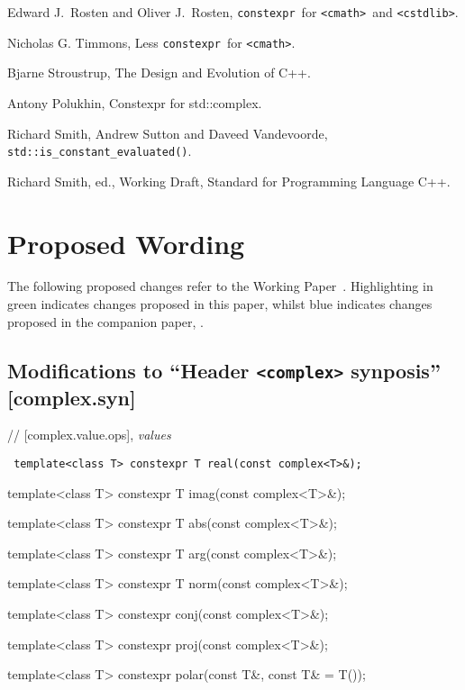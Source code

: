 \documentclass[prd,twocolumn,amsmath,amssymb,nofootinbib,eqsecnum]{revtex4-1}
\newcommand{\constexpr}{\code{constexpr}\xspace}
\newcommand{\code}[1]{{\tt #1}}
\newcommand{\header}[1]{{\tt <#1>}}
\newcommand{\cmath}{\header{cmath}}
\newcommand{\cstdlib}{\header{cstdlib}}
\newcommand{\highlight}[1]{{\color{green} #1}}
\newcommand{\oldhighlight}[1]{{\color{blue} #1}}
\begin{document}
\begin{thebibliography}{1}
	 Edward J.~Rosten and Oliver J.~Rosten, \constexpr\ for \cmath\ and \cstdlib.

	 Nicholas G. Timmons, Less \constexpr\ for \cmath.
	
	 Bjarne Stroustrup, The Design and Evolution of C++.

	 Antony Polukhin, Constexpr for std::complex.	
	
	 Richard Smith, Andrew Sutton and Daveed Vandevoorde, \code{std\!::\!is\_constant\_evaluated()}.
	
	 Richard Smith, ed., Working Draft, Standard for Programming Language C++.	
	
\end{thebibliography}

\newpage

\onecolumngrid

\section{Proposed Wording}

\setlength{\parindent}{0pt}


The following proposed changes refer to the Working Paper~\cite{WorkingPaper}. Highlighting in \highlight{green} indicates changes proposed in this paper, whilst \oldhighlight{blue} indicates changes proposed in the companion paper, \cite{Rosten-constexpr}.



\subsection{Modifications to ``Header \header{complex} synposis'' [complex.syn]}

// [complex.value.ops], {\it values }

\vspace{2ex}

\code{
  	template<class T> constexpr T real(const complex<T>\&);
	
  	template<class T> constexpr T imag(const complex<T>\&);

	\vspace{2ex}

	template<class T> \highlight{constexpr} T abs(const complex<T>\&);
 	
	template<class T> \highlight{constexpr} T arg(const complex<T>\&);
	
	template<class T> constexpr T norm(const complex<T>\&);
	
	\vspace{2ex}
	
	template<class T> constexpr conj(const complex<T>\&);
	
	template<class T> \highlight{constexpr} proj(const complex<T>\&);
	
	template<class T> \highlight{constexpr} polar(const T\&, const T\& = T());	

}
\end{document}
